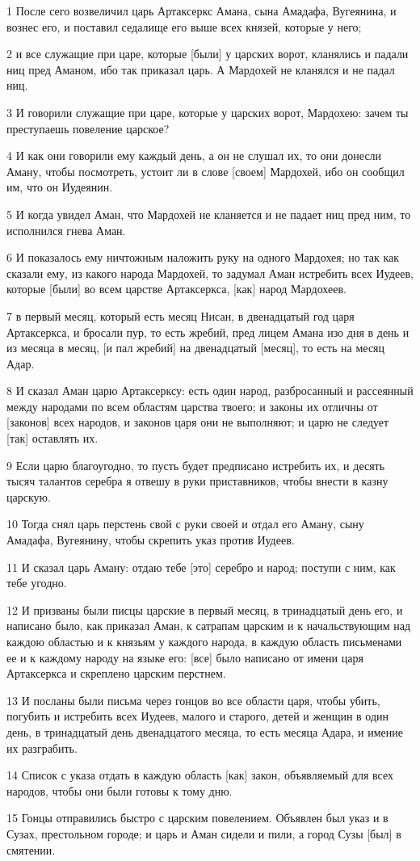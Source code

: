 \par 1 После сего возвеличил царь Артаксеркс Амана, сына Амадафа, Вугеянина, и вознес его, и поставил седалище его выше всех князей, которые у него;
\par 2 и все служащие при царе, которые [были] у царских ворот, кланялись и падали ниц пред Аманом, ибо так приказал царь. А Мардохей не кланялся и не падал ниц.
\par 3 И говорили служащие при царе, которые у царских ворот, Мардохею: зачем ты преступаешь повеление царское?
\par 4 И как они говорили ему каждый день, а он не слушал их, то они донесли Аману, чтобы посмотреть, устоит ли в слове [своем] Мардохей, ибо он сообщил им, что он Иудеянин.
\par 5 И когда увидел Аман, что Мардохей не кланяется и не падает ниц пред ним, то исполнился гнева Аман.
\par 6 И показалось ему ничтожным наложить руку на одного Мардохея; но так как сказали ему, из какого народа Мардохей, то задумал Аман истребить всех Иудеев, которые [были] во всем царстве Артаксеркса, [как] народ Мардохеев.
\par 7 в первый месяц, который есть месяц Нисан, в двенадцатый год царя Артаксеркса, и бросали пур, то есть жребий, пред лицем Амана изо дня в день и из месяца в месяц, [и пал жребий] на двенадцатый [месяц], то есть на месяц Адар.
\par 8 И сказал Аман царю Артаксерксу: есть один народ, разбросанный и рассеянный между народами по всем областям царства твоего; и законы их отличны от [законов] всех народов, и законов царя они не выполняют; и царю не следует [так] оставлять их.
\par 9 Если царю благоугодно, то пусть будет предписано истребить их, и десять тысяч талантов серебра я отвешу в руки приставников, чтобы внести в казну царскую.
\par 10 Тогда снял царь перстень свой с руки своей и отдал его Аману, сыну Амадафа, Вугеянину, чтобы скрепить указ против Иудеев.
\par 11 И сказал царь Аману: отдаю тебе [это] серебро и народ; поступи с ним, как тебе угодно.
\par 12 И призваны были писцы царские в первый месяц, в тринадцатый день его, и написано было, как приказал Аман, к сатрапам царским и к начальствующим над каждою областью и к князьям у каждого народа, в каждую область письменами ее и к каждому народу на языке его: [все] было написано от имени царя Артаксеркса и скреплено царским перстнем.
\par 13 И посланы были письма через гонцов во все области царя, чтобы убить, погубить и истребить всех Иудеев, малого и старого, детей и женщин в один день, в тринадцатый день двенадцатого месяца, то есть месяца Адара, и имение их разграбить.
\par 14 Список с указа отдать в каждую область [как] закон, объявляемый для всех народов, чтобы они были готовы к тому дню.
\par 15 Гонцы отправились быстро с царским повелением. Объявлен был указ и в Сузах, престольном городе; и царь и Аман сидели и пили, а город Сузы [был] в смятении.


